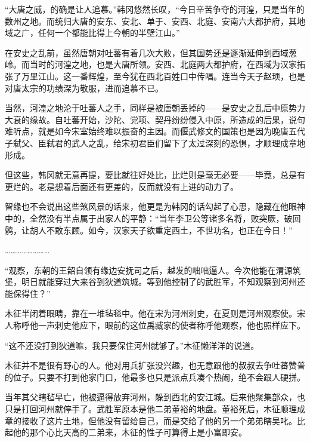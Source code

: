 “大唐之威，的确是让人追慕。”韩冈悠然长叹，“今日辛苦争夺的河湟，只是当年的数州之地。而统归大唐的安东、安北、单于、安西、北庭、安南六大都护府，其地域之广，任何一个都能比得上今朝的半壁江山。”

在安史之乱前，虽然唐朝对吐蕃有着几次大败，但其国势还是逐渐延伸到西域葱岭。而当时的河湟之地，也是大唐所领。安西、北庭两大都护府，在西域为汉家拓张了万里江山。这一番辉煌，至今犹在西北百姓口中传唱。连当今天子赵顼，也是对唐太宗的功绩深为敬服，进而追慕不已。

当然，河湟之地沦于吐蕃人之手，同样是被唐朝丢掉的——是安史之乱后中原势力大衰的缘故。自吐蕃开始，沙陀、党项、契丹纷纷侵入中原，所造成的后果，说句难听点，就是如今宋室始终难以振奋的主因。而偃武修文的国策也是因为晚唐五代子弑父、臣弑君的武人之乱，给宋初君臣们留下了太过深刻的恐惧，才顺理成章地形成。

但这些，韩冈就无意再提，要比就往好处比，比烂则是毫无必要——毕竟，总是有更烂的。老是想着后面还有更差的，反而就没有上进的动力了。

智缘也不会说出这些煞风景的话来，他更是为韩冈的话勾起了心思，隐藏在他眼神中的，全然没有半点属于出家人的平静：“当年李卫公等诸多名将，败突厥，破回鹘，让胡人不敢东顾。如今，汉家天子欲重定西土，不世功名，也正在今日！”

……………………

“观察，东朝的王韶自领有缘边安抚司之后，越发的咄咄逼人。今次他能在渭源筑堡，明日就能穿过大来谷到狄道筑城。等到他控制了的武胜军，不知观察到河州还能保得住？”

木征半闭着眼睛，靠在一堆毡毯中。他在宋为河州刺史，在夏则是河州观察使。宋人称呼他一声刺史他应下，眼前的这位禹臧家的使者称呼他观察，他也照样应下。

“这不还没打到狄道嘛，我只要保住河州就够了。”木征懒洋洋的说道。

木征并不是很有野心的人。他对用兵扩张没兴趣，也无意跟他的叔叔去争吐蕃赞普的位子。只要不打到他家门口，他最多也只是派点兵凑个热闹，绝不会跟人硬拼。

当年其父瞎毡早亡，他被逼得放弃河州，躲到西北的安江城。后来他聚集部众，也只是打回河州就停手了。武胜军原本是他二弟董裕的地盘。董裕死后，木征顺理成章的接收了这片土地，但他没有留给自己，而是交给了他的另一个弟弟瞎吴叱。比起他的那个心比天高的二弟来，木征的性子可算得上是小富即安。

